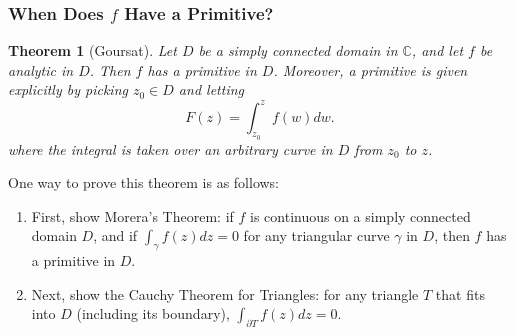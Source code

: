 \documentclass{article}
\newtheorem{theorem}{Theorem}[section]
\begin{document}
\subsubsection{When Does $f$ Have a Primitive?}
\begin{theorem}[Goursat]
Let $D$ be a simply connected domain in $\mathbb{C}$, and let $f$ be analytic in $D$. Then $f$ has a primitive in $D$. Moreover, a primitive is given explicitly by picking $z_0 \in D$ and letting
\begin{equation*}
F(z) = \int_{z_0}^z f(w)dw.
\end{equation*}
where the integral is taken over an arbitrary curve in $D$ from $z_0$ to $z$.
\end{theorem}
One way to prove this theorem is as follows:
\begin{enumerate}
\item First, show Morera's Theorem: if $f$ is continuous on a simply connected domain $D$, and if $\int_{\gamma}f(z)dz = 0$ for any triangular curve $\gamma$ in $D$, then $f$ has a primitive in $D$.
\item Next, show the Cauchy Theorem for Triangles: for any triangle $T$ that fits into $D$ (including its boundary), $\int_{\partial T}f(z)dz = 0$.
\end{enumerate}
\end{document}
